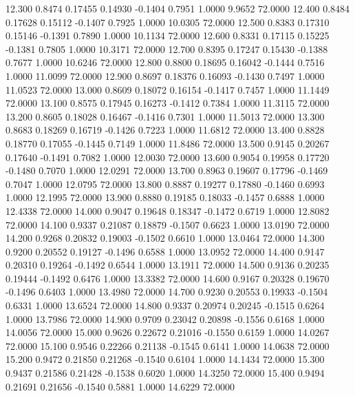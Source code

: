   12.300   0.8474   0.17455   0.14930  -0.1404   0.7951   1.0000   9.9652  72.0000
  12.400   0.8484   0.17628   0.15112  -0.1407   0.7925   1.0000  10.0305  72.0000
  12.500   0.8383   0.17310   0.15146  -0.1391   0.7890   1.0000  10.1134  72.0000
  12.600   0.8331   0.17115   0.15225  -0.1381   0.7805   1.0000  10.3171  72.0000
  12.700   0.8395   0.17247   0.15430  -0.1388   0.7677   1.0000  10.6246  72.0000
  12.800   0.8800   0.18695   0.16042  -0.1444   0.7516   1.0000  11.0099  72.0000
  12.900   0.8697   0.18376   0.16093  -0.1430   0.7497   1.0000  11.0523  72.0000
  13.000   0.8609   0.18072   0.16154  -0.1417   0.7457   1.0000  11.1449  72.0000
  13.100   0.8575   0.17945   0.16273  -0.1412   0.7384   1.0000  11.3115  72.0000
  13.200   0.8605   0.18028   0.16467  -0.1416   0.7301   1.0000  11.5013  72.0000
  13.300   0.8683   0.18269   0.16719  -0.1426   0.7223   1.0000  11.6812  72.0000
  13.400   0.8828   0.18770   0.17055  -0.1445   0.7149   1.0000  11.8486  72.0000
  13.500   0.9145   0.20267   0.17640  -0.1491   0.7082   1.0000  12.0030  72.0000
  13.600   0.9054   0.19958   0.17720  -0.1480   0.7070   1.0000  12.0291  72.0000
  13.700   0.8963   0.19607   0.17796  -0.1469   0.7047   1.0000  12.0795  72.0000
  13.800   0.8887   0.19277   0.17880  -0.1460   0.6993   1.0000  12.1995  72.0000
  13.900   0.8880   0.19185   0.18033  -0.1457   0.6888   1.0000  12.4338  72.0000
  14.000   0.9047   0.19648   0.18347  -0.1472   0.6719   1.0000  12.8082  72.0000
  14.100   0.9337   0.21087   0.18879  -0.1507   0.6623   1.0000  13.0190  72.0000
  14.200   0.9268   0.20832   0.19003  -0.1502   0.6610   1.0000  13.0464  72.0000
  14.300   0.9200   0.20552   0.19127  -0.1496   0.6588   1.0000  13.0952  72.0000
  14.400   0.9147   0.20310   0.19264  -0.1492   0.6544   1.0000  13.1911  72.0000
  14.500   0.9136   0.20235   0.19444  -0.1492   0.6476   1.0000  13.3382  72.0000
  14.600   0.9167   0.20328   0.19670  -0.1496   0.6403   1.0000  13.4980  72.0000
  14.700   0.9230   0.20553   0.19933  -0.1504   0.6331   1.0000  13.6524  72.0000
  14.800   0.9337   0.20974   0.20245  -0.1515   0.6264   1.0000  13.7986  72.0000
  14.900   0.9709   0.23042   0.20898  -0.1556   0.6168   1.0000  14.0056  72.0000
  15.000   0.9626   0.22672   0.21016  -0.1550   0.6159   1.0000  14.0267  72.0000
  15.100   0.9546   0.22266   0.21138  -0.1545   0.6141   1.0000  14.0638  72.0000
  15.200   0.9472   0.21850   0.21268  -0.1540   0.6104   1.0000  14.1434  72.0000
  15.300   0.9437   0.21586   0.21428  -0.1538   0.6020   1.0000  14.3250  72.0000
  15.400   0.9494   0.21691   0.21656  -0.1540   0.5881   1.0000  14.6229  72.0000
